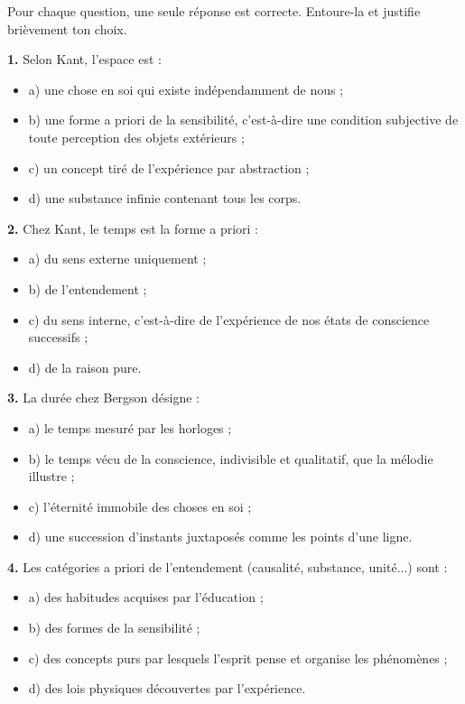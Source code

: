 \documentclass[11pt]{article}
\newcommand{\cle}[1]{{\popxbold\color{popdark}#1}}
\begin{document}
\begin{exercice}
Pour chaque question, une seule réponse est correcte. Entoure-la et justifie brièvement ton choix.

\textbf{1.} Selon Kant, l'espace est :
\begin{itemize}
\item a) une chose en soi qui existe indépendamment de nous ;
\item b) une forme a priori de la sensibilité, c'est-à-dire une condition subjective de toute perception des objets extérieurs ;
\item c) un concept tiré de l'expérience par abstraction ;
\item d) une substance infinie contenant tous les corps.
\end{itemize}

\textbf{2.} Chez Kant, le temps est la forme a priori :
\begin{itemize}
\item a) du sens externe uniquement ;
\item b) de l'entendement ;
\item c) du sens interne, c'est-à-dire de l'expérience de nos états de conscience successifs ;
\item d) de la raison pure.
\end{itemize}

\textbf{3.} La \cle{durée} chez Bergson désigne :
\begin{itemize}
\item a) le temps mesuré par les horloges ;
\item b) le temps vécu de la conscience, indivisible et qualitatif, que la mélodie illustre ;
\item c) l'éternité immobile des choses en soi ;
\item d) une succession d'instants juxtaposés comme les points d'une ligne.
\end{itemize}

\textbf{4.} Les catégories a priori de l'entendement (causalité, substance, unité...) sont :
\begin{itemize}
\item a) des habitudes acquises par l'éducation ;
\item b) des formes de la sensibilité ;
\item c) des concepts purs par lesquels l'esprit pense et organise les phénomènes ;
\item d) des lois physiques découvertes par l'expérience.
\end{itemize}
\end{exercice}
\end{document}
